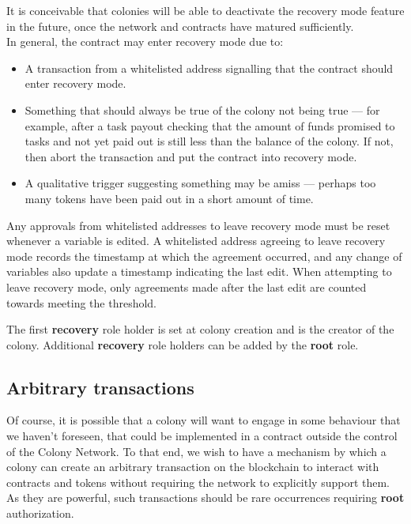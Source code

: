 It is conceivable that colonies will be able to deactivate the recovery mode feature in the future, once the network and contracts have matured sufficiently. \\

In general, the contract may enter recovery mode due to:

\begin{itemize}
 \item A transaction from a whitelisted address signalling that the contract should enter recovery mode.
 \item Something that should always be true of the colony not being true --- for example, after a task payout checking that the amount of funds promised to tasks and not yet paid out is still less than the balance of the colony. If not, then abort the transaction and put the contract into recovery mode.
 \item A qualitative trigger suggesting something may be amiss --- perhaps too many tokens have been paid out in a short amount of time.
\end{itemize}

Any approvals from whitelisted addresses to leave recovery mode must be reset whenever a variable is edited. A whitelisted address agreeing to leave recovery mode records the timestamp at which the agreement occurred, and any change of variables also update a timestamp indicating the last edit. When attempting to leave recovery mode, only agreements made after the last edit are counted towards meeting the threshold.

The first \textbf{recovery} role holder is set at colony creation and is the creator of the colony. Additional \textbf{recovery} role holders can be added by the \textbf{root} role.

\subsection{Arbitrary transactions}\label{sec:arbitrary-transaction}

Of course, it is possible that a colony will want to engage in some behaviour that we haven't foreseen, that could be implemented in a contract outside the control of the Colony Network. To that end, we wish to have a mechanism by which a colony can create an arbitrary transaction on the blockchain to interact with contracts and tokens without requiring the network to explicitly support them. As they are powerful, such transactions should be rare occurrences requiring \textbf{root} authorization.
